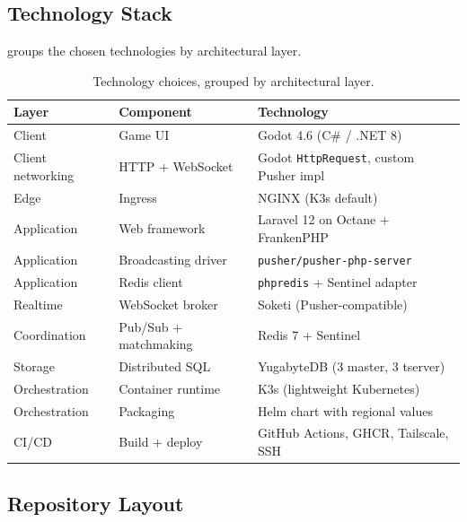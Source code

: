 \documentclass{scrartcl}
\begin{document}
\subsection{Technology Stack}

 groups the chosen technologies by architectural
layer.

\begin{table}[H]
  \centering
  \begin{tabular}{@{}lll@{}}
    \toprule
    \textbf{Layer} & \textbf{Component} & \textbf{Technology} \\
    \midrule
    Client                      & Game UI                & Godot 4.6 (C\# / .NET 8)             \\
    Client networking           & HTTP + WebSocket       & Godot \texttt{HttpRequest}, custom Pusher impl \\
    Edge                        & Ingress                & NGINX (K3s default)                  \\
    Application                 & Web framework          & Laravel 12 on Octane + FrankenPHP    \\
    Application                 & Broadcasting driver    & \texttt{pusher/pusher-php-server}    \\
    Application                 & Redis client           & \texttt{phpredis} + Sentinel adapter \\
    Realtime                    & WebSocket broker       & Soketi (Pusher-compatible)           \\
    Coordination                & Pub/Sub + matchmaking  & Redis 7 + Sentinel                   \\
    Storage                     & Distributed SQL        & YugabyteDB (3 master, 3 tserver)     \\
    Orchestration               & Container runtime      & K3s (lightweight Kubernetes)         \\
    Orchestration               & Packaging              & Helm chart with regional values      \\
    CI/CD                       & Build + deploy         & GitHub Actions, GHCR, Tailscale, SSH \\
    \bottomrule
  \end{tabular}
  \caption{Technology choices, grouped by architectural layer.}
  \label{tab:stack}
\end{table}

\subsection{Repository Layout}
\end{document}
